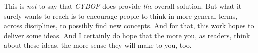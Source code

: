 This is \emph{not} to say that \emph{CYBOP} does provide \emph{the} overall
solution. But what it surely wants to reach is to encourage people to think in
more general terms, across disciplines, to possibly find new concepts. And for
that, this work hopes to deliver some ideas. And I certainly do hope that the
more you, as readers, think about these ideas, the more sense they will make to
you, too.
